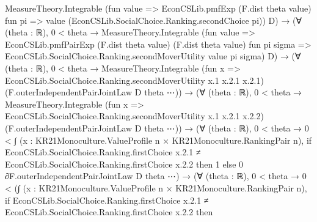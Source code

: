 \documentclass[10pt]{article}
\begin{document}
\begin{ReviewVerbatim}
                              MeasureTheory.Integrable
                                (fun value =>
                                  EconCSLib.pmfExp (F.dist theta value) fun pi =>
                                    value (EconCSLib.SocialChoice.Ranking.secondChoice pi))
                                D) →
                          (∀ (theta : ℝ),
                              0 < theta →
                                MeasureTheory.Integrable
                                  (fun value =>
                                    EconCSLib.pmfPairExp (F.dist theta value) (F.dist theta value) fun pi sigma =>
                                      EconCSLib.SocialChoice.Ranking.secondMoverUtility value pi sigma)
                                  D) →
                            (∀ (theta : ℝ),
                                0 < theta →
                                  MeasureTheory.Integrable
                                    (fun x => EconCSLib.SocialChoice.Ranking.secondMoverUtility x.1 x.2.1 x.2.1)
                                    (F.outerIndependentPairJointLaw D theta ⋯)) →
                              (∀ (theta : ℝ),
                                  0 < theta →
                                    MeasureTheory.Integrable
                                      (fun x => EconCSLib.SocialChoice.Ranking.secondMoverUtility x.1 x.2.1 x.2.2)
                                      (F.outerIndependentPairJointLaw D theta ⋯)) →
                                (∀ (theta : ℝ),
                                    0 < theta →
                                      0 <
                                        ∫ (x : KR21Monoculture.ValueProfile n × KR21Monoculture.RankingPair n),
                                          if
                                              EconCSLib.SocialChoice.Ranking.firstChoice x.2.1 ≠
                                                EconCSLib.SocialChoice.Ranking.firstChoice x.2.2 then
                                            1
                                          else 0 ∂F.outerIndependentPairJointLaw D theta ⋯) →
                                  (∀ (theta : ℝ),
                                      0 < theta →
                                        0 <
                                          (∫ (x : KR21Monoculture.ValueProfile n × KR21Monoculture.RankingPair n),
                                              if
                                                  EconCSLib.SocialChoice.Ranking.firstChoice x.2.1 ≠
                                                    EconCSLib.SocialChoice.Ranking.firstChoice x.2.2 then

\end{ReviewVerbatim}
\end{document}
